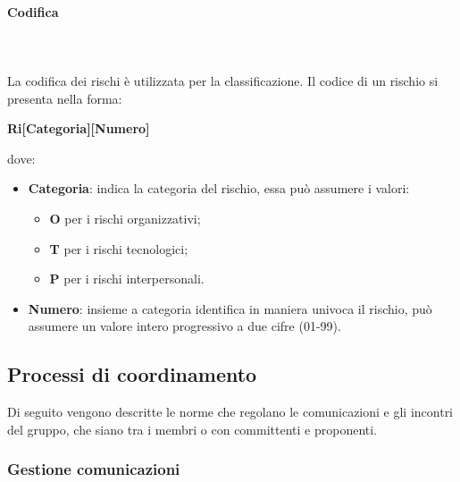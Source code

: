 \paragraph{Codifica}\mbox{} \\ \mbox{} \\
La codifica dei rischi è utilizzata per la classificazione. Il codice di un rischio si presenta nella forma: \\
\centerline{\textbf{Ri[Categoria][Numero]}}
dove:
\begin{itemize}
	\item \textbf{Categoria}: indica la categoria del rischio, essa può assumere i valori:
	\begin{itemize}
		\item \textbf{O} per i rischi organizzativi;
		\item \textbf{T} per i rischi tecnologici;
		\item \textbf{P} per i rischi interpersonali.
	\end{itemize}
	\item \textbf{Numero}: insieme a categoria identifica in maniera univoca il rischio, può assumere un valore intero progressivo a due cifre (01-99).
\end{itemize}

\subsection{Processi di coordinamento}
Di seguito vengono descritte le norme che regolano le comunicazioni e gli incontri del gruppo, che siano tra i membri o con committenti e proponenti.
\subsubsection{Gestione comunicazioni}
